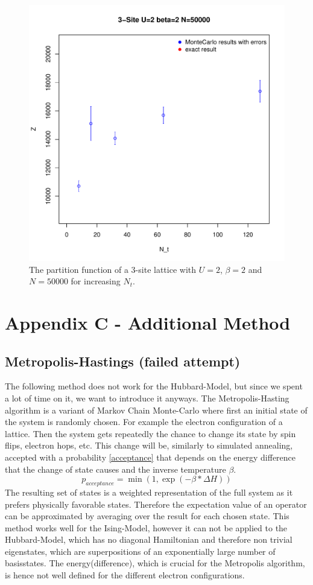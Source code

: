 \begin{figure}[H]
	\centering
	\includegraphics[width=0.5\linewidth]{figs/plot_Z3Nt}
	\caption[L3 Partition function]{The partition function of a 3-site lattice with $U=2$, $\beta=2$ and $N=50000$ for increasing $N_t$.}
	\label{fig:plotz3nt}
\end{figure}

\section{Appendix C - Additional Method}
\subsection{Metropolis-Hastings (failed attempt)}
The following method does not work for the Hubbard-Model, but since we spent a lot of time on it, we want to introduce it anyways.
The Metropolis-Hasting algorithm is a variant of Markov Chain Monte-Carlo where first an initial state of the system is randomly chosen.
For example the electron configuration of a lattice. Then the system gets repeatedly the chance to change its state by spin flips, electron hops, etc. This change will be, similarly to simulated annealing, accepted with a probability \eqref{acceptance} that depends on the energy difference that the change of state causes and the inverse temperature $\beta$.
\begin{equation}\label{acceptance}
p_{acceptance} = \min(1,\exp(-\beta*\Delta H))
\end{equation}
The resulting set of states is a weighted representation of the full system as it prefers physically favorable states.
Therefore the expectation value of an operator can be approximated by averaging over the result for each chosen state.
This method works well for the Ising-Model, however it can not be applied to the Hubbard-Model, which has no diagonal Hamiltonian and therefore non trivial eigenstates, which are superpositions of an exponentially large number of basisstates.
The energy(difference), which is crucial for the Metropolis algorithm, is hence not well defined for the different electron configurations.